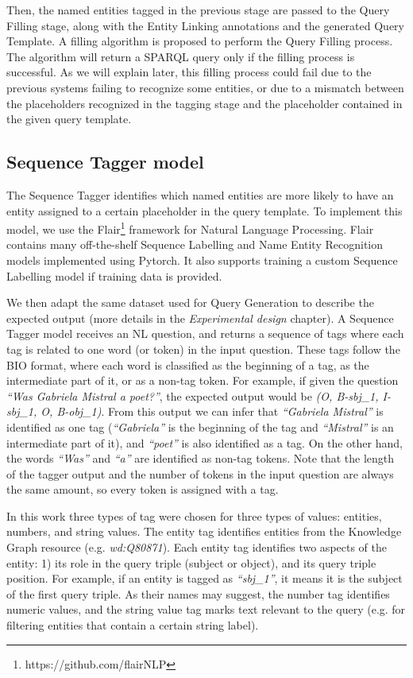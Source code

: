 Then, the named entities tagged in the previous stage are passed to the Query Filling stage, 
along with the Entity Linking annotations and the generated Query Template. A filling 
algorithm is proposed to perform the Query Filling process. The algorithm will return a 
SPARQL query only if the filling process is successful. As we will explain later, this filling 
process could fail due to the previous systems failing to recognize some entities, or due to 
a mismatch between the placeholders recognized in the tagging stage and the placeholder 
contained in the given query template.

\subsection{Sequence Tagger model}
The Sequence Tagger identifies which named entities are more likely to have an entity 
assigned to a certain placeholder in the query template. To implement this model, we use the 
Flair\footnote{https://github.com/flairNLP} framework for Natural Language Processing. Flair 
contains many off-the-shelf Sequence Labelling and Name Entity Recognition models implemented 
using Pytorch. It also supports  training a custom Sequence Labelling model if training data 
is provided.

We then adapt the same dataset used for Query Generation to describe the expected output (more 
details in the \textit{Experimental design} chapter). A Sequence Tagger model receives an NL 
question, and returns a sequence of tags where each tag is related to one word (or token) in 
the input question. These tags follow the BIO format, where each word is classified as the 
beginning of a tag, as the intermediate part of it, or as a non-tag token. For example, if 
given the question \textit{“Was Gabriela Mistral a poet?”}, the expected output would be 
\textit{(O, B-sbj\_1, I-sbj\_1, O, B-obj\_1)}. From this output we can infer that \textit{“Gabriela 
Mistral”} is identified as one tag (\textit{“Gabriela”} is the beginning of the tag and 
\textit{“Mistral”} is an intermediate part of it), and \textit{“poet”} is also identified as 
a tag. On the other hand, the words \textit{“Was”} and \textit{“a”} are identified as non-tag 
tokens. Note that the length of the tagger output and the number of tokens in the input 
question are always the same amount, so every token is assigned with a tag.

In this work three types of tag were chosen for three types of values: entities, numbers, and 
string values. The entity tag identifies entities from the Knowledge Graph resource (e.g. 
\textit{wd:Q80871}). Each entity tag identifies two aspects of the entity: 1) its role in the 
query triple (subject or object), and its query triple position. For example, if an entity is 
tagged as \textit{“sbj\_1”}, it means it is the subject of the first query triple. As their 
names may suggest, the number tag identifies numeric values, and the string value tag marks 
text relevant to the query (e.g. for filtering entities that contain a certain string label).

